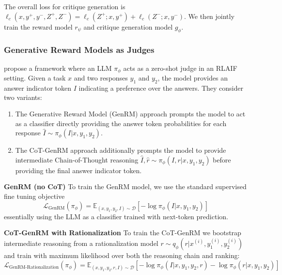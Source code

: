 The overall loss for critique generation is $\ell_c(x, y^+, y^-, Z^+, Z^-) = \ell_c(Z^+; x, y^+) + \ell_c(Z^-; x, y^-)$. We then jointly train the reward model $r_\psi$ and critique generation model $g_\phi$.

\subsubsection{Generative Reward Models as Judges}

\autocite{mahan2024generativerewardmodels} propose a framework where an LLM $\pi_\phi$ acts as a zero-shot judge in an RLAIF setting. Given a task $x$ and two responses $y_1$ and $y_2$, the model provides an answer indicator token $I$ indicating a preference over the answers. They consider two variants:

\begin{enumerate}
    \item The Generative Reward Model (GenRM) approach prompts the model to act as a classifier directly providing the answer token probabilities for each response $\hat{I} \sim \pi_\phi(I|x, y_1, y_2)$.
    \item The CoT-GenRM approach additionally prompts the model to provide intermediate Chain-of-Thought reasoning $\hat{I}, \hat{r} \sim \pi_\phi(I, r|x, y_1, y_2)$ before providing the final answer indicator token.
\end{enumerate}

\vspace{1em}
\textbf{GenRM (no CoT)}
To train the GenRM model, we use the standard supervised fine tuning objective
\begin{equation}
    \mathcal{L}_\text{GenRM}(\pi_\phi) = \mathbb{E}_{(x,y_1,y_2,I)\sim\mathcal{D}}[-\log \pi_\phi(I|x, y_1, y_2)]
\end{equation}
essentially using the LLM as a classifier trained with next-token prediction.

\vspace{1em}
\textbf{CoT-GenRM with Rationalization}
To train the CoT-GenRM we bootstrap intermediate reasoning from a rationalization model $r \sim q_\phi(r|x^{(i)}, y_1^{(i)}, y_2^{(i)})$ and train with maximum likelihood over both the reasoning chain and ranking:
\begin{equation}
    \mathcal{L}_\text{GenRM-Rationalization}(\pi_\phi) = \mathbb{E}_{(x,y_1,y_2,r,I)\sim\mathcal{D}}[-\log \pi_\phi(I|x, y_1, y_2, r) - \log \pi_\phi(r|x, y_1, y_2)]
\end{equation}

